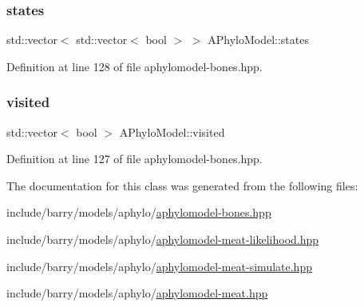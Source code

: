 \subsubsection{\texorpdfstring{states}{states}}
{\footnotesize\ttfamily std\+::vector$<$ std\+::vector$<$ bool $>$ $>$ A\+Phylo\+Model\+::states}



Definition at line 128 of file aphylomodel-\/bones.\+hpp.

\mbox{\label{class_a_phylo_model_ac98b6767ff0c32b30caf23dbf6810578}} 
\subsubsection{\texorpdfstring{visited}{visited}}
{\footnotesize\ttfamily std\+::vector$<$ bool $>$ A\+Phylo\+Model\+::visited}



Definition at line 127 of file aphylomodel-\/bones.\+hpp.



The documentation for this class was generated from the following files\+:\begin{DoxyCompactItemize}
\item 
include/barry/models/aphylo/\hyperlink{aphylomodel-bones_8hpp}{aphylomodel-\/bones.\+hpp}\item 
include/barry/models/aphylo/\hyperlink{aphylomodel-meat-likelihood_8hpp}{aphylomodel-\/meat-\/likelihood.\+hpp}\item 
include/barry/models/aphylo/\hyperlink{aphylomodel-meat-simulate_8hpp}{aphylomodel-\/meat-\/simulate.\+hpp}\item 
include/barry/models/aphylo/\hyperlink{aphylomodel-meat_8hpp}{aphylomodel-\/meat.\+hpp}\end{DoxyCompactItemize}
